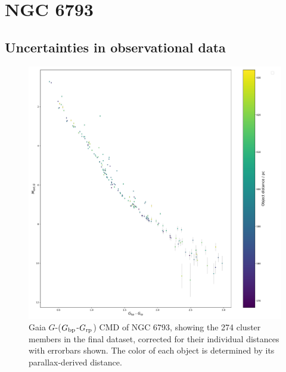 \documentclass[12pt, a4paper]{report}
\begin{document}
\section{NGC 6793}
\subsection{Uncertainties in observational data}

\begin{figure}[h!]
\begin{center}
\includegraphics[width=1.0\textwidth]{../NGC_6793_CMD_observational_errorbars.pdf}
\caption{Gaia $G$-($G_{\textnormal{bp}}$-$G_{\textnormal{rp}}$) CMD of NGC 6793, showing the 274 cluster members in the final dataset, corrected for their individual distances with errorbars shown. The color of each object is determined by its parallax-derived distance.}
\label{NGC_6793_obs_only}
\end{center}
\end{figure}
\end{document}
